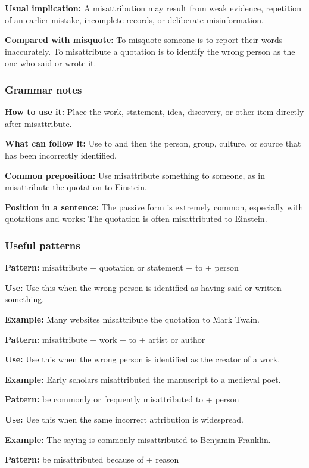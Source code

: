 \documentclass[11pt]{article}
\begin{document}
\textbf{Usual implication:} A misattribution may result from weak evidence, repetition of an earlier mistake, incomplete records, or deliberate misinformation.

\textbf{Compared with misquote:} To misquote someone is to report their words inaccurately. To misattribute a quotation is to identify the wrong person as the one who said or wrote it.

\subsubsection{Grammar notes}
\textbf{How to use it:} Place the work, statement, idea, discovery, or other item directly after misattribute.

\textbf{What can follow it:} Use to and then the person, group, culture, or source that has been incorrectly identified.

\textbf{Common preposition:} Use misattribute something to someone, as in misattribute the quotation to Einstein.

\textbf{Position in a sentence:} The passive form is extremely common, especially with quotations and works: The quotation is often misattributed to Einstein.

\subsubsection{Useful patterns}
\textbf{Pattern:} misattribute + quotation or statement + to + person

\textbf{Use:} Use this when the wrong person is identified as having said or written something.

\textbf{Example:} Many websites misattribute the quotation to Mark Twain.

\textbf{Pattern:} misattribute + work + to + artist or author

\textbf{Use:} Use this when the wrong person is identified as the creator of a work.

\textbf{Example:} Early scholars misattributed the manuscript to a medieval poet.

\textbf{Pattern:} be commonly or frequently misattributed to + person

\textbf{Use:} Use this when the same incorrect attribution is widespread.

\textbf{Example:} The saying is commonly misattributed to Benjamin Franklin.

\textbf{Pattern:} be misattributed because of + reason
\end{document}
